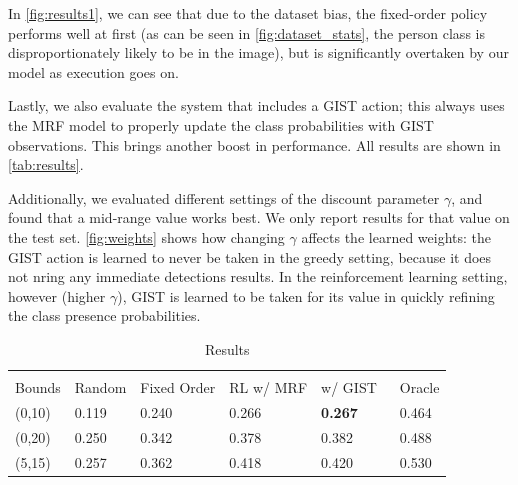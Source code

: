 In \autoref{fig:results1}, we can see that due to the dataset bias, the fixed-order policy performs well at first (as can be seen in \autoref{fig:dataset_stats}, the person class is disproportionately likely to be in the image), but is significantly overtaken by our model as execution goes on.

Lastly, we also evaluate the system that includes a GIST action; this always uses the MRF model to properly update the class probabilities with GIST observations.
This brings another boost in performance.
All results are shown in \autoref{tab:results}.

Additionally, we evaluated different settings of the discount parameter $\gamma$, and found that a mid-range value works best.
We only report results for that value on the test set.
\autoref{fig:weights} shows how changing $\gamma$ affects the learned weights: the GIST action is learned to never be taken in the greedy setting, because it does not nring any immediate detections results.
In the reinforcement learning setting, however (higher $\gamma$), GIST is learned to be taken for its value in quickly refining the class presence probabilities.

\begin{table}[t]
\caption{Results}
\label{tab:results}
\begin{center}
\begin{tabular}{|l|l|l|l|l|l|}
\\ \hline \\
Bounds & Random & Fixed Order & RL w/ MRF & w/ GIST  & Oracle \\ \hline
(0,10) & 0.119  & 0.240       & 0.266     & \textbf{0.267}    & 0.464 \\ 
(0,20) & 0.250  & 0.342       & 0.378     & 0.382    & 0.488 \\ 
(5,15) & 0.257  & 0.362       & 0.418     & 0.420    & 0.530 \\
\end{tabular}
\end{center}
\end{table}

